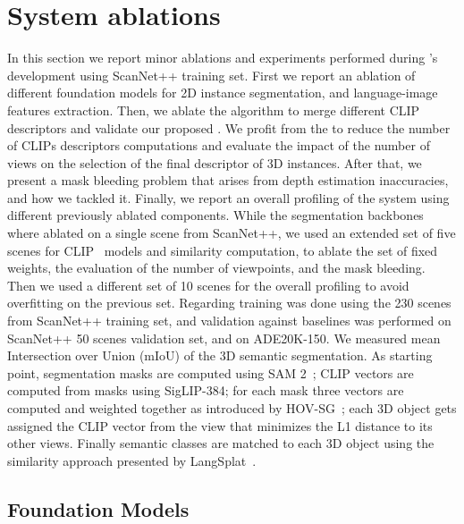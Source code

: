 \section{System ablations}
In this section we report minor ablations and experiments performed during \ours's development using ScanNet++ training set.
First we report an ablation of different foundation models for 2D instance segmentation, and language-image features extraction.
Then, we ablate the algorithm to merge different CLIP descriptors and validate our proposed \clipours.
We profit from the \clipours to reduce the number of CLIPs descriptors computations and evaluate the impact of the number of views on the selection of the final descriptor of 3D instances.
After that, we present a mask bleeding problem that arises from depth estimation inaccuracies, and how we tackled it.
Finally, we report an overall profiling of the system using different previously ablated components.
\newline
While the segmentation backbones where ablated on a single scene from ScanNet++, we used an extended set of five scenes for CLIP~\cite{radford2021clip} models and similarity computation, to ablate the set of fixed weights, the evaluation of the number of viewpoints, and the mask bleeding.
Then we used a different set of 10 scenes for the overall profiling to avoid overfitting on the previous set.
Regarding \clipours training was done using the 230 scenes from ScanNet++ training set, and validation against baselines was performed on ScanNet++ 50 scenes validation set, and on ADE20K-150.
We measured mean Intersection over Union (mIoU) of the 3D semantic segmentation.
\newline
As starting point, segmentation masks are computed using SAM 2~\cite{kirillov2023sam}; CLIP vectors are computed from masks using SigLIP-384; for each mask three vectors are computed and weighted together as introduced by HOV-SG~\cite{hovsg}; each 3D object gets assigned the CLIP vector from the view that minimizes the L1 distance to its other views. Finally semantic classes are matched to each 3D object using the similarity approach presented by LangSplat~\cite{qin2024langsplat}. 
%
\subsection{Foundation Models}
